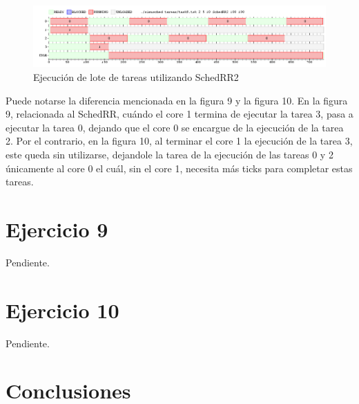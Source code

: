 \documentclass[a4paper,10pt,twoside]{article}
\begin{document}
\begin{figure}[ht!]
\centering
\includegraphics[width=175mm]{../ejercicio8/schedRR2ej8.png}
\caption{Ejecución de lote de tareas utilizando SchedRR2}
\label{overflow}
\end{figure}

Puede notarse la diferencia mencionada en la figura 9 y la figura 10. En la figura 9, relacionada al SchedRR, cuándo el core 1 termina de ejecutar la tarea 3, pasa a ejecutar la tarea 0, dejando que el core 0 se encargue de la ejecución de la tarea 2. Por el contrario, en la figura 10, al terminar el core 1 la ejecución de la tarea 3, este queda sin utilizarse, dejandole la tarea de la ejecución de las tareas 0 y 2 únicamente al core 0 el cuál, sin el core 1, necesita más ticks para completar estas tareas.



\section{Ejercicio 9}

Pendiente.




\section{Ejercicio 10}

Pendiente.




\section{Conclusiones}
\end{document}
